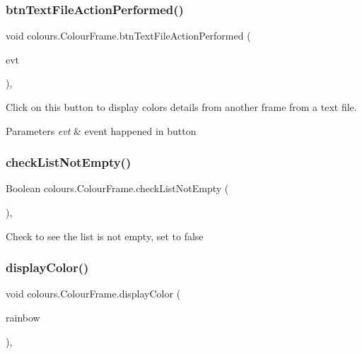 \subsubsection{\texorpdfstring{btn\+Text\+File\+Action\+Performed()}{btnTextFileActionPerformed()}}
{\footnotesize\ttfamily void colours.\+Colour\+Frame.\+btn\+Text\+File\+Action\+Performed (\begin{DoxyParamCaption}\item[{java.\+awt.\+event.\+Action\+Event}]{evt }\end{DoxyParamCaption})\hspace{0.3cm}{\ttfamily [inline]}, {\ttfamily [private]}}

Click on this button to display colors details from another frame from a text file. 
\begin{DoxyParams}{Parameters}
{\em evt} & event happened in button \\
\hline
\end{DoxyParams}
\mbox{\label{classcolours_1_1_colour_frame_a693e820f5c6ea43ce0a862bd751f42c3}} 
\subsubsection{\texorpdfstring{check\+List\+Not\+Empty()}{checkListNotEmpty()}}
{\footnotesize\ttfamily Boolean colours.\+Colour\+Frame.\+check\+List\+Not\+Empty (\begin{DoxyParamCaption}{ }\end{DoxyParamCaption})\hspace{0.3cm}{\ttfamily [inline]}, {\ttfamily [private]}}

Check to see the list is not empty, set to false \mbox{\label{classcolours_1_1_colour_frame_a97c8597f65a97de8993a1ab05d39dd44}} 
\subsubsection{\texorpdfstring{display\+Color()}{displayColor()}}
{\footnotesize\ttfamily void colours.\+Colour\+Frame.\+display\+Color (\begin{DoxyParamCaption}\item[{List$<$ \hyperlink{classcolours_1_1_color_rainbow}{Color\+Rainbow} $>$}]{rainbow }\end{DoxyParamCaption})\hspace{0.3cm}{\ttfamily [inline]}, {\ttfamily [private]}}

